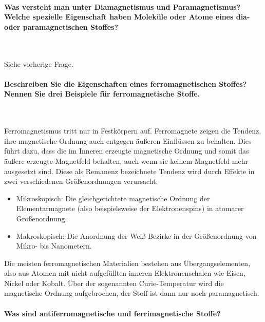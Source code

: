 \documentclass[a4paper, 11pt, ngerman, parskip=half-]{scrartcl}
\begin{document}
\paragraph{Was versteht man unter Diamagnetismus und Paramagnetismus? Welche spezielle Eigenschaft
    haben Moleküle oder Atome eines dia- oder paramagnetischen Stoffes?} ~

Siehe vorherige Frage.

\paragraph{Beschreiben Sie die Eigenschaften eines ferromagnetischen Stoffes? Nennen Sie drei
    Beispiele für ferromagnetische Stoffe.} ~

Ferromagnetismus tritt nur in Festkörpern auf. Ferromagnete zeigen die Tendenz, ihre magnetische
Ordnung auch entgegen äußeren Einflüssen zu behalten. Dies führt dazu, dass die im Inneren erzeugte
magnetische Ordnung und somit das äußere erzeugte Magnetfeld behalten, auch wenn sie keinem
Magnetfeld mehr ausgesetzt sind. Diese als Remanenz bezeichnete Tendenz wird durch Effekte in zwei
verschiedenen Größenordnungen verursacht:

\begin{itemize}
    \item Mikroskopisch: Die gleichgerichtete magnetische Ordnung der Elementarmagnete (also
          beispielsweise der Elektronenspins) in atomarer Größenordnung.

    \item Makroskopisch: Die Anordnung der Weiß-Bezirke in der Größenordnung von Mikro- bis
          Nanometern.
\end{itemize}

Die meisten ferromagnetischen Materialien bestehen aus Übergangselementen, also aus Atomen mit nicht
aufgefüllten inneren Elektronenschalen wie Eisen, Nickel oder Kobalt. Über der sogenannten
Curie-Temperatur wird die magnetische Ordnung aufgebrochen, der Stoff ist dann nur noch
paramagnetisch.

\paragraph{Was sind antiferromagnetische und ferrimagnetische Stoffe?} ~
\end{document}
